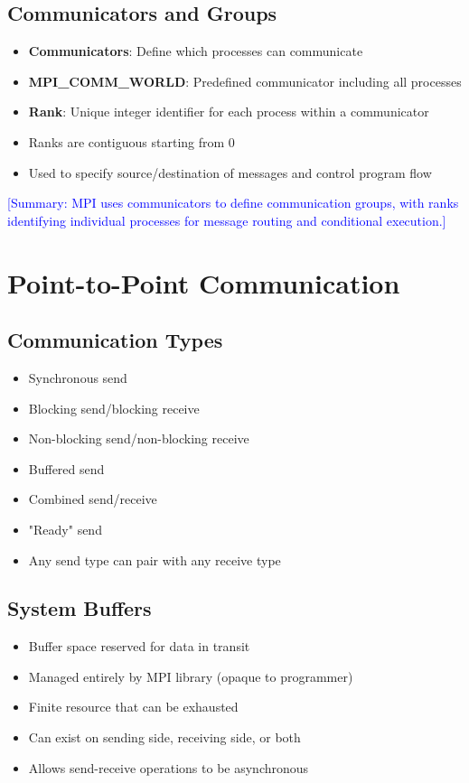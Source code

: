 \documentclass[12pt]{article}
\begin{document}
\subsection{Communicators and Groups}
\begin{itemize}
    \item \textbf{Communicators}: Define which processes can communicate
    \item \textbf{MPI\_COMM\_WORLD}: Predefined communicator including all processes
    \item \textbf{Rank}: Unique integer identifier for each process within a communicator
    \item Ranks are contiguous starting from 0
    \item Used to specify source/destination of messages and control program flow
\end{itemize}

\textcolor{blue}{[Summary: MPI uses communicators to define communication groups, with ranks identifying individual processes for message routing and conditional execution.]}

\section{Point-to-Point Communication}

\subsection{Communication Types}
\begin{itemize}
    \item Synchronous send
    \item Blocking send/blocking receive
    \item Non-blocking send/non-blocking receive
    \item Buffered send
    \item Combined send/receive
    \item "Ready" send
    \item Any send type can pair with any receive type
\end{itemize}

\subsection{System Buffers}
\begin{itemize}
    \item Buffer space reserved for data in transit
    \item Managed entirely by MPI library (opaque to programmer)
    \item Finite resource that can be exhausted
    \item Can exist on sending side, receiving side, or both
    \item Allows send-receive operations to be asynchronous
\end{itemize}
\end{document}
